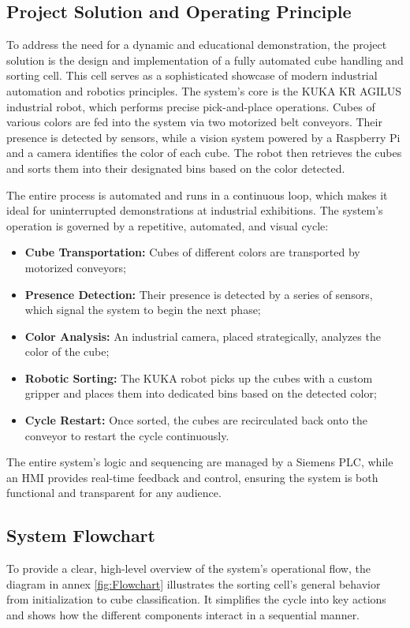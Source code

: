 \subsection{Project Solution and Operating Principle}
To address the need for a dynamic and educational demonstration, the project solution is the design and implementation of a fully automated cube handling and sorting cell. This cell serves as a sophisticated showcase of modern industrial automation and robotics principles.
\newline
The system's core is the KUKA KR AGILUS industrial robot, which performs precise pick-and-place operations. Cubes of various colors are fed into the system via two motorized belt conveyors. Their presence is detected by sensors, while a vision system powered by a Raspberry Pi and a camera identifies the color of each cube. The robot then retrieves the cubes and sorts them into their designated bins based on the color detected.

The entire process is automated and runs in a continuous loop, which makes it ideal for uninterrupted demonstrations at industrial exhibitions. The system's operation is governed by a repetitive, automated, and visual cycle:

\begin{itemize}
\item \textbf{Cube Transportation:} Cubes of different colors are transported by motorized conveyors;
\item \textbf{Presence Detection:} Their presence is detected by a series of sensors, which signal the system to begin the next phase;
\item \textbf{Color Analysis:} An industrial camera, placed strategically, analyzes the color of the cube;
\item \textbf{Robotic Sorting:} The KUKA robot picks up the cubes with a custom gripper and places them into dedicated bins based on the detected color;
\item \textbf{Cycle Restart:} Once sorted, the cubes are recirculated back onto the conveyor to restart the cycle continuously.
\end{itemize}

The entire system's logic and sequencing are managed by a Siemens PLC, while an HMI provides real-time feedback and control, ensuring the system is both functional and transparent for any audience.

\subsection{System Flowchart}
To provide a clear, high-level overview of the system's operational flow, the diagram in annex \ref{fig:Flowchart} illustrates the sorting cell's general behavior from initialization to cube classification. It simplifies the cycle into key actions and shows how the different components interact in a sequential manner.



